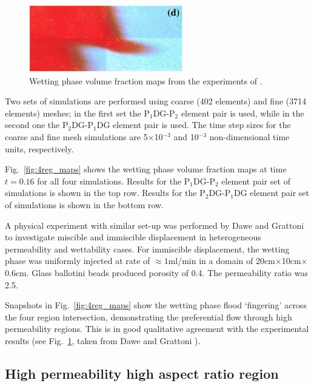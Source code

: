 \documentclass[times]{fldauth}
\newcommand{\PN}[2][error]{P$_{#1}$DG-P$_{#2}$}
\begin{document}
\begin{figure}[h!]
  \begin{center}
    \includegraphics[width=0.6\textwidth]{Real_quadrant}
    \caption{Wetting phase volume fraction maps from the experiments
      of \cite{dawe_2008}. \label{fig:dawe_real}}
  \end{center}
\end{figure}

Two sets of simulations are performed using coarse (402 elements) and
fine (3714 elements) meshes; in the first set the \PN[1]{2} element
pair is used, while in the second one the \PN[2]{1}DG element pair is
used. The time step sizes for the coarse and fine mesh simulations are
5$\times$10$^{-3}$ and 10$^{-3}$ non-dimensional time units,
respectively.

Fig.~\ref{fig:4reg_maps} shows the wetting phase volume fraction maps
at time $t=0.16$ for all four simulations. Results for the
\PN[1]{2} element pair set of simulations is shown in the top row.
Results for the \PN[2]{1}DG element pair set of simulations is shown
in the bottom row.


A physical experiment with similar set-up was performed by Dawe and Grattoni
\cite{dawe_2008} to investigate miscible and immiscible displacement
in heterogeneous permeability and wettability cases. For immiscible
displacement, the wetting phase was uniformly injected at rate of
$\approx 1$ml/min in a domain of 20cm$\times$10cm$\times$0.6cm. Glass
ballotini beads produced porosity of 0.4. The permeability ratio was
2.5.

Snapshots in Fig.~\ref{fig:4reg_maps} show the wetting phase flood
`fingering' across the four region intersection, demonstrating the
preferential flow through high permeability regions. This is in good
qualitative agreement with the experimental results
(see Fig.~\ref{fig:dawe_real}, taken from Dawe and Grattoni \cite{dawe_2008}).

\subsection{High permeability high aspect ratio region}\label{res4}
\end{document}
